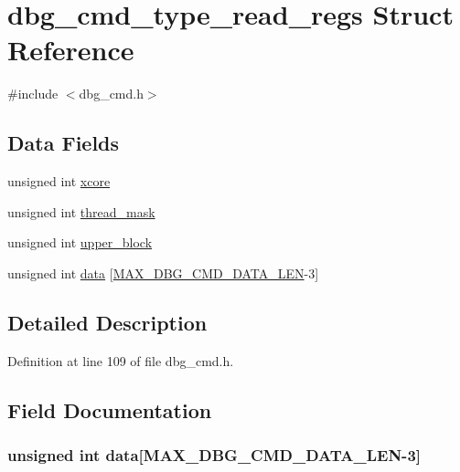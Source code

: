\hypertarget{structdbg__cmd__type__read__regs}{\section{dbg\-\_\-cmd\-\_\-type\-\_\-read\-\_\-regs Struct Reference}
\label{structdbg__cmd__type__read__regs}
}


{\ttfamily \#include $<$dbg\-\_\-cmd.\-h$>$}

\subsection*{Data Fields}
\begin{DoxyCompactItemize}
\item 
unsigned int \hyperlink{structdbg__cmd__type__read__regs_a78357326dd562d441c3c73f5676ac638}{xcore}
\item 
unsigned int \hyperlink{structdbg__cmd__type__read__regs_a2cafb0001a9bc70c6466b0d0ab295c0a}{thread\-\_\-mask}
\item 
unsigned int \hyperlink{structdbg__cmd__type__read__regs_a78e2cce5b7b32d6e7d7f5b1cb281f39f}{upper\-\_\-block}
\item 
unsigned int \hyperlink{structdbg__cmd__type__read__regs_a728dc245dc576de10147524d6a701ef3}{data} \mbox{[}\hyperlink{dbg__cmd_8h_a4552ec15033c8a68870cdf80eda5470c}{M\-A\-X\-\_\-\-D\-B\-G\-\_\-\-C\-M\-D\-\_\-\-D\-A\-T\-A\-\_\-\-L\-E\-N}-\/3\mbox{]}
\end{DoxyCompactItemize}


\subsection{Detailed Description}


Definition at line 109 of file dbg\-\_\-cmd.\-h.



\subsection{Field Documentation}
\hypertarget{structdbg__cmd__type__read__regs_a728dc245dc576de10147524d6a701ef3}{
\subsubsection[{data}]{\setlength{\rightskip}{0pt plus 5cm}unsigned int data\mbox{[}{\bf M\-A\-X\-\_\-\-D\-B\-G\-\_\-\-C\-M\-D\-\_\-\-D\-A\-T\-A\-\_\-\-L\-E\-N}-\/3\mbox{]}}}\label{structdbg__cmd__type__read__regs_a728dc245dc576de10147524d6a701ef3}


